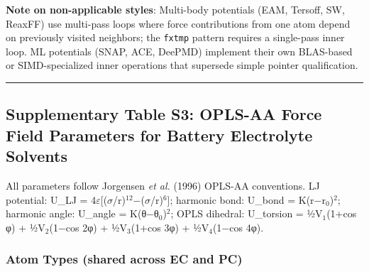 \documentclass[
  11pt,
]{article}
\begin{document}
\textbf{Note on non-applicable styles}: Multi-body potentials (EAM,
Tersoff, SW, ReaxFF) use multi-pass loops where force contributions from
one atom depend on previously visited neighbors; the \texttt{fxtmp}
pattern requires a single-pass inner loop. ML potentials (SNAP, ACE,
DeePMD) implement their own BLAS-based or SIMD-specialized inner
operations that supersede simple pointer qualification.

\begin{center}\rule{0.5\linewidth}{0.5pt}\end{center}

\subsection{Supplementary Table S3: OPLS-AA Force Field Parameters for
Battery Electrolyte
Solvents}\label{supplementary-table-s3-opls-aa-force-field-parameters-for-battery-electrolyte-solvents}

All parameters follow Jorgensen \emph{et al.} (1996) OPLS-AA
conventions. LJ potential: U\_LJ =
4\(\varepsilon\){[}(\(\sigma\)/r)\(^{12}\)−(\(\sigma\)/r)\(^{6}\){]};
harmonic bond: U\_bond = K(r−r\(_{0}\))\(^{2}\); harmonic angle:
U\_angle = K(θ−θ\(_{0}\))\(^{2}\); OPLS dihedral: U\_torsion =
½V\(_{1}\)(1+cos φ) + ½V\(_{2}\)(1−cos 2φ) + ½V\(_{3}\)(1+cos 3φ) +
½V\(_{4}\)(1−cos 4φ).

\subsubsection{Atom Types (shared across EC and
PC)}\label{atom-types-shared-across-ec-and-pc}
\end{document}
